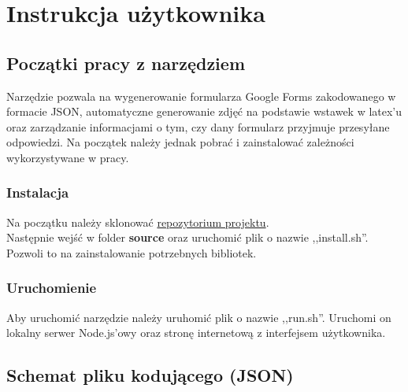 
\chapter{Instrukcja użytkownika}
\section{Początki pracy  z narzędziem}
Narzędzie pozwala na wygenerowanie formularza Google Forms zakodowanego w formacie JSON, automatyczne generowanie zdjęć na podstawie wstawek w latex'u oraz zarządzanie informacjami o tym, czy dany formularz przyjmuje przesyłane odpowiedzi. Na początek należy jednak pobrać i zainstalować zależności wykorzystywane w pracy.
\subsection{Instalacja}
Na początku należy sklonować \href{https://github.com/agnpawicka/pracaInzynierska/}{repozytorium projektu}.\\
Następnie wejść w folder \textbf{source} oraz uruchomić plik o nazwie ,,install.sh''. Pozwoli to na zainstalowanie potrzebnych bibliotek.
\subsection{Uruchomienie}
Aby uruchomić narzędzie należy uruhomić plik o nazwie ,,run.sh''. Uruchomi on lokalny serwer Node.js'owy oraz stronę internetową z interfejsem użytkownika.
\section{Schemat pliku kodującego (JSON)}

